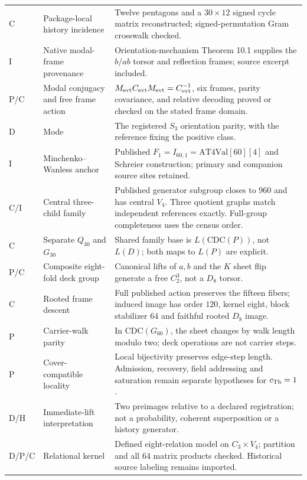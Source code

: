 \begin{longtable}{@{}p{}p{}p{}@{}}
C & Package-local history incidence & Twelve pentagons and a $30\times12$ signed cycle matrix reconstructed; signed-permutation Gram crosswalk checked. \\
I & Native modal-frame provenance & Orientation-mechanism Theorem 10.1 supplies the $b/ab$ torsor and reflection frames; source excerpt included. \\
P/C & Modal conjugacy and free frame action & $M_{\mathrm{evt}}C_{\mathrm{evt}}M_{\mathrm{evt}}=C_{\mathrm{evt}}^{-1}$, six frames, parity covariance, and relative decoding proved or checked on the stated frame domain. \\
D & Mode & The registered $S_3$ orientation parity, with the reference fixing the positive class. \\

I & Minchenko--Wanless anchor & Published $F_1=I_{60,1}=\mathrm{AT4Val}[60][4]$ and Schreier construction; primary and companion source sites retained. \\
C/I & Central three-child family & Published generator subgroup closes to $960$ and has central $V_4$. Three quotient graphs match independent references exactly. Full-group completeness uses the census order. \\
C & Separate $Q_{30}$ and $G_{30}$ & Shared family base is $L(\mathrm{CDC}(P))$, not $L(D)$; both maps to $L(P)$ are explicit. \\
P/C & Composite eight-fold deck group & Canonical lifts of $a,b$ and the $K$ sheet flip generate a free $C_2^3$, not a $D_8$ torsor. \\
C & Rooted frame descent & Full published action preserves the fifteen fibers; induced image has order $120$, kernel eight, block stabilizer $64$ and faithful rooted $D_8$ image. \\
P & Carrier-walk parity & In $\mathrm{CDC}(G_{60})$, the sheet changes by walk length modulo two; deck operations are not carrier steps. \\
P & Cover-compatible locality & Local bijectivity preserves edge-step length. Admission, recovery, field addressing and saturation remain separate hypotheses for $c_{\rm Th}=1$. \\
D/H & Immediate-lift interpretation & Two preimages relative to a declared registration; not a probability, coherent superposition or a history generator. \\
D/P/C & Relational kernel & Defined eight-relation model on $C_3\times V_4$; partition and all $64$ matrix products checked. Historical source labeling remains imported. \\

\end{longtable}
